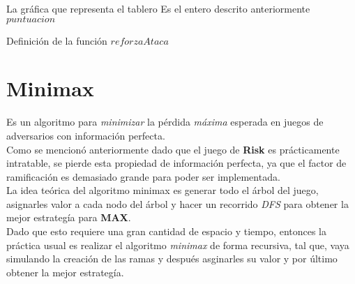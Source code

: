 \documentclass[12pt,twocolumn,draft]{article}
\begin{document}
\begin{algorithm}
\begin{algorithmic}[1]
\REQUIRE La gr\'afica que representa el tablero
\ENSURE Es el entero descrito anteriormente
\ENDFOR
{}
\ENDIF
{}
\ENDIF
{}
\ENDIF
{}
\ENDIF
{}
\ENDIF
{}
\ENDIF
{}
\ENDIF
{}
\ENDIF
\ENDFOR
\ENDWHILE
\RETURN $puntuacion$
\end{algorithmic}
\caption{Definici\'on de la funci\'on $reforzaAtaca$}
\label{reforzaAtaca}
\end{algorithm}




\section{Minimax}

Es un algoritmo para \textit{minimizar} la p\'erdida \textit{m\'axima} esperada en juegos de adversarios con
informaci\'on perfecta.\\

Como se mencion\'o anteriormente dado que el juego de \textbf{Risk} es pr\'acticamente intratable, se pierde esta propiedad
de informaci\'on perfecta, ya que el factor de ramificaci\'on es demasiado grande para poder ser implementada.\\

La idea te\'orica del algoritmo minimax es generar todo el \'arbol del juego, asignarles valor a cada
nodo del \'arbol y hacer un recorrido \textit{DFS} para obtener la mejor estrateg\'ia para \textbf{MAX}.\\

Dado que esto requiere una gran cantidad de espacio y tiempo, entonces la pr\'actica usual es realizar
el algoritmo \textit{minimax} de forma recursiva, tal que, vaya simulando la creaci\'on de las ramas y despu\'es
asginarles su valor y por \'ultimo obtener la mejor estrateg\'ia.\\
\end{document}
